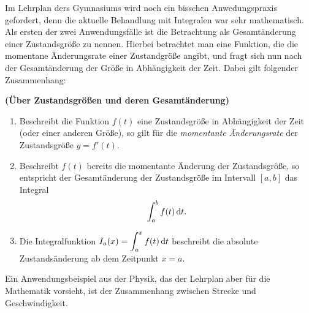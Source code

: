 \documentclass[ngerman, 12pt]{nssheetxea}
\begin{document}
Im Lehrplan ders Gymnasiums wird noch ein bisschen Anwedungspraxis gefordert, denn die aktuelle Behandlung mit Integralen war sehr mathematisch. Als ersten der zwei Anwendungsfälle ist die Betrachtung als Gesamtänderung einer Zustandsgröße zu nennen. Hierbei betrachtet man eine Funktion, die die momentane Änderungsrate einer Zustandgröße angibt, und fragt sich nun nach der Gesamtänderung der Größe in Abhängigkeit der Zeit. Dabei gilt folgender Zusammenhang:

\begin{theorem} \textbf{(Über Zustandsgrößen und deren Gesamtänderung)}
\begin{enumerate}
\item Beschreibt die Funktion $f(t)$ eine Zustandsgröße in Abhängigkeit der Zeit (oder einer anderen Größe), so gilt für die \textit{momentante Änderungsrate} der Zustandsgröße $y=f'(t)$.
\item Beschreibt $f(t)$ bereits die momentante Änderung der Zustandsgröße, so entspricht der Gesamtänderung der Zustandsgröße im Intervall $[a,b]$ das Integral
\[ \int_a^bf(t)\mathop{}\!\mathrm{d} t.\]
\item Die Integralfunktion $\displaystyle I_a(x)=\int_a^xf(t)\mathop{}\!\mathrm{d} t$ beschreibt die absolute Zustandsänderung ab dem Zeitpunkt $x=a$.
\end{enumerate}
 
\end{theorem}

Ein Anwendungsbeispiel aus der Physik, das der Lehrplan aber für die Mathematik vorsieht, ist der Zusammenhang zwischen Strecke und Geschwindigkeit.
\end{document}
